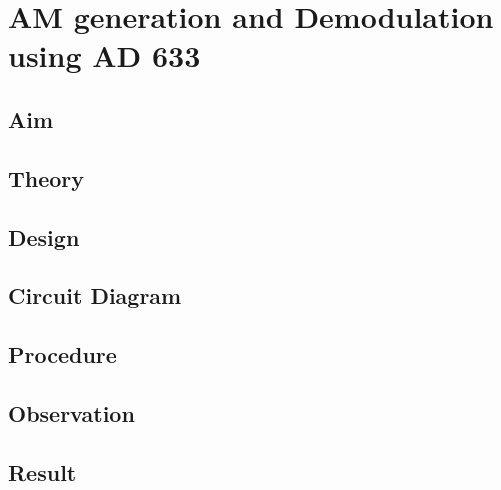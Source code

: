 
\chapter[AM generation and Demodulation using AD 633]{AM generation and Demodulation using AD 633}
\section*{Aim}
\section*{Theory}
\section*{Design}
\section*{Circuit Diagram}
\section*{Procedure}
\section*{Observation}
\section*{Result}